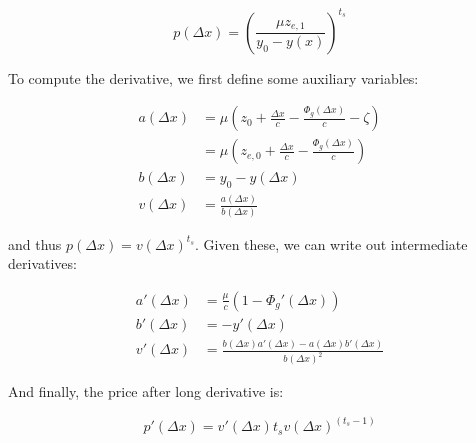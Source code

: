 \begin{equation}
p(\Delta x) = \left( \frac{\mu z_{e,1}}{y_{0} - y(x)} \right)^{t_{s}}
\end{equation}

To compute the derivative, we first define some auxiliary variables:

\begin{equation}
\begin{aligned}
a(\Delta x) &= \mu (z_{0} + \frac{\Delta x}{c} - \frac{\Phi_{g}(\Delta x)}{c} - \zeta) \\
&= \mu \left( z_{e,0} + \frac{\Delta x}{c} - \frac{\Phi_{g}(\Delta x)}{c} \right) \\
b(\Delta x) &= y_0 - y(\Delta x) \\
v(\Delta x) &= \frac{a(\Delta x)}{b(\Delta x)}
\end{aligned}
\end{equation}

and thus $p(\Delta x) = v(\Delta x)^{t_{s}}$.
Given these, we can write out intermediate derivatives:

\begin{equation}
\begin{aligned}
a'(\Delta x) &= \frac{\mu}{c} (1 - \Phi_{g}'(\Delta x)) \\
b'(\Delta x) &= -y'(\Delta x) \\
v'(\Delta x) &= \frac{b(\Delta x) a'(\Delta x) - a(\Delta x) b'(\Delta x)}{b(\Delta x)^2}
\end{aligned}
\end{equation}

And finally, the price after long derivative is:

\begin{equation}
p'(\Delta x) = v'(\Delta x) t_{s} v(\Delta x)^{(t_{s} - 1)}
\end{equation}